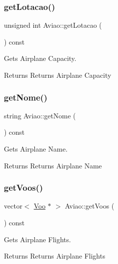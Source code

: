 \subsubsection{\texorpdfstring{get\+Lotacao()}{getLotacao()}}
{\footnotesize\ttfamily unsigned int Aviao\+::get\+Lotacao (\begin{DoxyParamCaption}{ }\end{DoxyParamCaption}) const}



Gets Airplane Capacity. 

\begin{DoxyReturn}{Returns}
Returns Airplane Capacity 
\end{DoxyReturn}
\mbox{\label{class_aviao_a8c8a2ab8493ee41fbef8bfd6f0bf935b}} 
\subsubsection{\texorpdfstring{get\+Nome()}{getNome()}}
{\footnotesize\ttfamily string Aviao\+::get\+Nome (\begin{DoxyParamCaption}{ }\end{DoxyParamCaption}) const}



Gets Airplane Name. 

\begin{DoxyReturn}{Returns}
Returns Airplane Name 
\end{DoxyReturn}
\mbox{\label{class_aviao_a035f7a3fde1c7d95756f58945895ba5e}} 
\subsubsection{\texorpdfstring{get\+Voos()}{getVoos()}}
{\footnotesize\ttfamily vector$<$ \hyperlink{class_voo}{Voo} $\ast$ $>$ Aviao\+::get\+Voos (\begin{DoxyParamCaption}{ }\end{DoxyParamCaption}) const}



Gets Airplane Flights. 

\begin{DoxyReturn}{Returns}
Returns Airplane Flights 
\end{DoxyReturn}
\mbox{\label{class_aviao_a941cebc71075ba31ea488ef2116d3db6}} 
